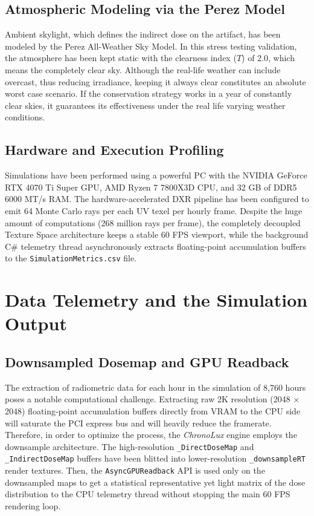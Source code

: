 \subsection{Atmospheric Modeling via the Perez Model}

Ambient skylight, which defines the indirect dose on the artifact, has been modeled by the Perez All-Weather Sky Model. In this stress testing validation, the atmosphere has been kept static with the clearness index ($T$) of 2.0, which means the completely clear sky. Although the real-life weather can include overcast, thus reducing irradiance, keeping it always clear constitutes an absolute worst case scenario. If the conservation strategy works in a year of constantly clear skies, it guarantees its effectiveness under the real life varying weather conditions.

\subsection{Hardware and Execution Profiling}

Simulations have been performed using a powerful PC with the NVIDIA GeForce RTX 4070 Ti Super GPU, AMD Ryzen 7 7800X3D CPU, and 32 GB of DDR5 6000 MT/s RAM. The hardware-accelerated DXR pipeline has been configured to emit 64 Monte Carlo rays per each UV texel per hourly frame. Despite the huge amount of computations (268 million rays per frame), the completely decoupled Texture Space architecture keeps a stable 60 FPS viewport, while the background C\# telemetry thread asynchronously extracts floating-point accumulation buffers to the \texttt{SimulationMetrics.csv} file.

\section{Data Telemetry and the Simulation Output}

\subsection{Downsampled Dosemap and GPU Readback}

The extraction of radiometric data for each hour in the simulation of 8,760 hours poses a notable computational challenge. Extracting raw 2K resolution (2048 $\times$ 2048) floating-point accumulation buffers directly from VRAM to the CPU side will saturate the PCI express bus and will heavily reduce the framerate. Therefore, in order to optimize the process, the \textit{ChronoLux} engine employs the downsample architecture. The high-resolution \texttt{\_DirectDoseMap} and \texttt{\_IndirectDoseMap} buffers have been blitted into lower-resolution \texttt{\_downsampleRT} render textures. Then, the \texttt{AsyncGPUReadback} API is used only on the downsampled maps to get a statistical representative yet light matrix of the dose distribution to the CPU telemetry thread without stopping the main 60 FPS rendering loop.

